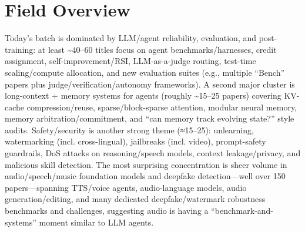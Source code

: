 \documentclass[12pt,letterpaper]{article}
\begin{document}
\medskip



\section*{Field Overview}
{\footnotesize Today's batch is dominated by LLM/agent reliability, evaluation, and post-training: at least \textasciitilde{}40--60 titles focus on agent benchmarks/harnesses, credit assignment, self-improvement/RSI, LLM-as-a-judge routing, test-time scaling/compute allocation, and new evaluation suites (e.g., multiple ``Bench'' papers plus judge/verification/autonomy frameworks). A second major cluster is long-context + memory systems for agents (roughly \textasciitilde{}15--25 papers) covering KV-cache compression/reuse, sparse/block-sparse attention, modular neural memory, memory arbitration/commitment, and ``can memory track evolving state?'' style audits. Safety/security is another strong theme (≈15--25): unlearning, watermarking (incl. cross-lingual), jailbreaks (incl. video), prompt-safety guardrails, DoS attacks on reasoning/speech models, context leakage/privacy, and malicious skill detection. The most surprising concentration is sheer volume in audio/speech/music foundation models and deepfake detection---well over 150 papers---spanning TTS/voice agents, audio-language models, audio generation/editing, and many dedicated deepfake/watermark robustness benchmarks and challenges, suggesting audio is having a ``benchmark-and-systems'' moment similar to LLM agents.}
\end{document}
